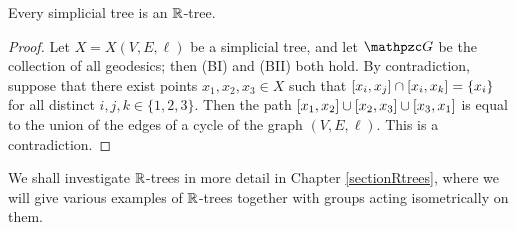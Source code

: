 
\begin{corollary}
Every simplicial tree is an $\R$-tree.
\end{corollary}
\begin{proof}
Let $X = X(V,E,\ell)$ be a simplicial tree, and let $\GG$ be the collection of all geodesics; then (BI) and (BII) both hold. By contradiction, suppose that there exist points $x_1,x_2,x_3\in X$ such that $[x_i,x_j]\cap[x_i,x_k] = \{x_i\}$ for all distinct $i,j,k\in\{1,2,3\}$. Then the path $[x_1,x_2]\cup[x_2,x_3]\cup[x_3,x_1]$ is equal to the union of the edges of a cycle of the graph $(V,E,\ell)$. This is a contradiction.
\end{proof}

We shall investigate $\R$-trees in more detail in Chapter \ref{sectionRtrees}, where we will give various examples of $\R$-trees together with groups acting isometrically on them.










